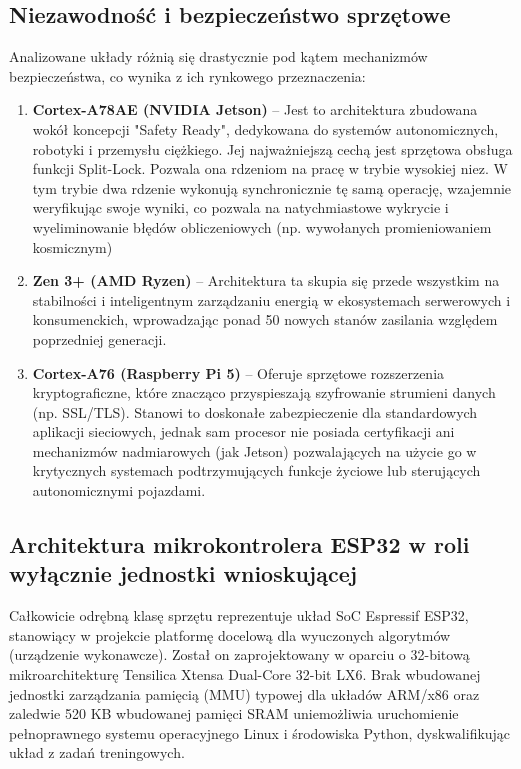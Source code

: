 \documentclass[12pt,twoside]{article}
\begin{document}
\subsection{Niezawodność i bezpieczeństwo sprzętowe}
Analizowane układy różnią się drastycznie pod kątem mechanizmów bezpieczeństwa, co wynika z ich rynkowego przeznaczenia:
\begin{enumerate}[label=\alph*), leftmargin=1.25cm] 
	\item \textbf{Cortex-A78AE (NVIDIA Jetson)} -- Jest to architektura zbudowana wokół koncepcji "Safety Ready", dedykowana do systemów autonomicznych, robotyki i przemysłu ciężkiego. Jej najważniejszą cechą jest sprzętowa obsługa funkcji Split-Lock. Pozwala ona rdzeniom na pracę w trybie wysokiej niez. W tym trybie dwa rdzenie wykonują synchronicznie tę samą operację, wzajemnie weryfikując swoje wyniki, co pozwala na natychmiastowe wykrycie i wyeliminowanie błędów obliczeniowych (np. wywołanych promieniowaniem kosmicznym)
	\item \textbf{Zen 3+ (AMD Ryzen)} -- Architektura ta skupia się przede wszystkim na stabilności i inteligentnym zarządzaniu energią w ekosystemach serwerowych i konsumenckich, wprowadzając ponad 50 nowych stanów zasilania względem poprzedniej generacji.
	\item \textbf{Cortex-A76 (Raspberry Pi 5)} -- Oferuje sprzętowe rozszerzenia kryptograficzne, które znacząco przyspieszają szyfrowanie strumieni danych (np. SSL/TLS). Stanowi to doskonałe zabezpieczenie dla standardowych aplikacji sieciowych, jednak sam procesor nie posiada certyfikacji ani mechanizmów nadmiarowych (jak Jetson) pozwalających na użycie go w krytycznych systemach podtrzymujących funkcje życiowe lub sterujących autonomicznymi pojazdami.
\end{enumerate}

\subsection{Architektura mikrokontrolera ESP32 w roli wyłącznie jednostki wnioskującej}
Całkowicie odrębną klasę sprzętu reprezentuje układ SoC Espressif ESP32, stanowiący w projekcie platformę docelową dla wyuczonych algorytmów (urządzenie wykonawcze). Został on zaprojektowany w oparciu o 32-bitową mikroarchitekturę Tensilica Xtensa Dual-Core 32-bit LX6. Brak wbudowanej jednostki zarządzania pamięcią (MMU) typowej dla układów ARM/x86 oraz zaledwie 520 KB wbudowanej pamięci SRAM uniemożliwia uruchomienie pełnoprawnego systemu operacyjnego Linux i środowiska Python, dyskwalifikując układ z zadań treningowych.
\end{document}

